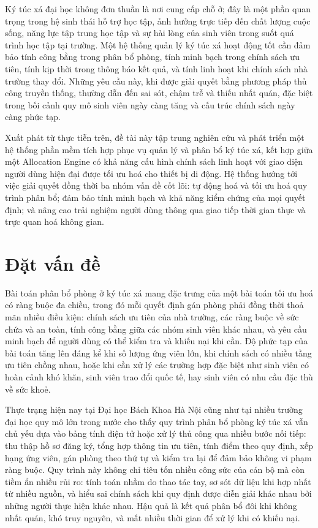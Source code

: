 \documentclass[a4paper,12pt,openany,oneside]{report}
\begin{document}
Ký túc xá đại học không đơn thuần là nơi cung cấp chỗ ở; đây là một phần quan
trọng trong hệ sinh thái hỗ trợ học tập, ảnh hưởng trực tiếp đến chất lượng
cuộc sống, năng lực tập trung học tập và sự hài lòng của sinh viên trong suốt
quá trình học tập tại trường. Một hệ thống quản lý ký túc xá hoạt động tốt cần
đảm bảo tính công bằng trong phân bổ phòng, tính minh bạch trong chính sách ưu
tiên, tính kịp thời trong thông báo kết quả, và tính linh hoạt khi chính sách
nhà trường thay đổi. Những yêu cầu này, khi được giải quyết bằng phương pháp
thủ công truyền thống, thường dẫn đến sai sót, chậm trễ và thiếu nhất quán,
đặc biệt trong bối cảnh quy mô sinh viên ngày càng tăng và cấu trúc chính sách
ngày càng phức tạp.

Xuất phát từ thực tiễn trên, đề tài này tập trung nghiên cứu và phát triển một
hệ thống phần mềm tích hợp phục vụ quản lý và phân bổ ký túc xá, kết hợp giữa
một Allocation Engine có khả năng cấu hình chính sách linh hoạt với giao diện
người dùng hiện đại được tối ưu hoá cho thiết bị di động. Hệ thống hướng tới
việc giải quyết đồng thời ba nhóm vấn đề cốt lõi: tự động hoá và tối ưu hoá
quy trình phân bổ; đảm bảo tính minh bạch và khả năng kiểm chứng của mọi quyết
định; và nâng cao trải nghiệm người dùng thông qua giao tiếp thời gian thực và
trực quan hoá không gian.

\section{Đặt vấn đề}

Bài toán phân bổ phòng ở ký túc xá mang đặc trưng của một bài toán tối ưu hoá
có ràng buộc đa chiều, trong đó mỗi quyết định gán phòng phải đồng thời thoả
mãn nhiều điều kiện: chính sách ưu tiên của nhà trường, các ràng buộc về sức
chứa và an toàn, tính công bằng giữa các nhóm sinh viên khác nhau, và yêu cầu
minh bạch để người dùng có thể kiểm tra và khiếu nại khi cần. Độ phức tạp của
bài toán tăng lên đáng kể khi số lượng ứng viên lớn, khi chính sách có nhiều
tầng ưu tiên chồng nhau, hoặc khi cần xử lý các trường hợp đặc biệt như sinh
viên có hoàn cảnh khó khăn, sinh viên trao đổi quốc tế, hay sinh viên có nhu
cầu đặc thù về sức khoẻ.

Thực trạng hiện nay tại Đại học Bách Khoa Hà Nội cũng như tại nhiều trường đại
học quy mô lớn trong nước cho thấy quy trình phân bổ phòng ký túc xá vẫn chủ
yếu dựa vào bảng tính điện tử hoặc xử lý thủ công qua nhiều bước nối tiếp: thu
thập hồ sơ đăng ký, tổng hợp thông tin ưu tiên, tính điểm theo quy định, xếp
hạng ứng viên, gán phòng theo thứ tự và kiểm tra lại để đảm bảo không vi phạm
ràng buộc. Quy trình này không chỉ tiêu tốn nhiều công sức của cán bộ mà còn
tiềm ẩn nhiều rủi ro: tính toán nhầm do thao tác tay, sơ sót dữ liệu khi hợp
nhất từ nhiều nguồn, và hiểu sai chính sách khi quy định được diễn giải khác
nhau bởi những người thực hiện khác nhau. Hậu quả là kết quả phân bổ đôi khi
không nhất quán, khó truy nguyên, và mất nhiều thời gian để xử lý khi có khiếu
nại.
\end{document}
